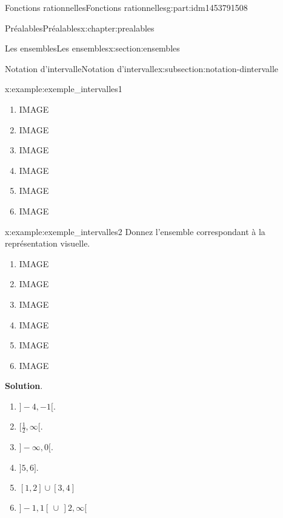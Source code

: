 \documentclass[oneside,10pt,]{book}
\newcommand{\blocktitlefont}{\relax}
\begin{document}
\begin{partptx}{Fonctions rationnelles}{}{Fonctions rationnelles}{}{}{g:part:idm1453791508}
\begin{chapterptx}{Préalables}{}{Préalables}{}{}{x:chapter:prealables}
\begin{sectionptx}{Les ensembles}{}{Les ensembles}{}{}{x:section:ensembles}
\begin{subsectionptx}{Notation d'intervalle}{}{Notation d'intervalle}{}{}{x:subsection:notation-dintervalle}
\begin{example}{}{x:example:exemple_intervalles1}
\begin{enumerate}
\item{}IMAGE%
\item{}IMAGE%
\item{}IMAGE%
\item{}IMAGE%
\item{}IMAGE%
\item{}IMAGE%
\end{enumerate}
%
\end{example}
%
\par
\begin{example}{}{x:example:exemple_intervalles2}%
Donnez l'ensemble correspondant à la représentation visuelle.%
%
\begin{multicols}{2}
\begin{enumerate}
\item{}IMAGE%
\item{}IMAGE%
\item{}IMAGE%
\item{}IMAGE%
\item{}IMAGE%
\item{}IMAGE%
\end{enumerate}
\end{multicols}
\par\smallskip%
\noindent\textbf{\blocktitlefont Solution}.\hypertarget{g:solution:idm1454130828}{}\quad{}%
\begin{enumerate}
\item{}\(]-4,-1[\).%
\item{}\([\frac{1}{2},\infty[\).%
\item{}\(]-\infty,0[\).%
\item{}\(]5,6]\).%
\item{}\(\displaystyle [1,2] \cup [3,4]\)%
\item{}\(\displaystyle ]-1,1[ \,\cup\, ]2,\infty[\)%
\end{enumerate}
%
\end{example}
%
\end{subsectionptx}
\end{sectionptx}
\end{chapterptx}
\end{partptx}
\end{document}
